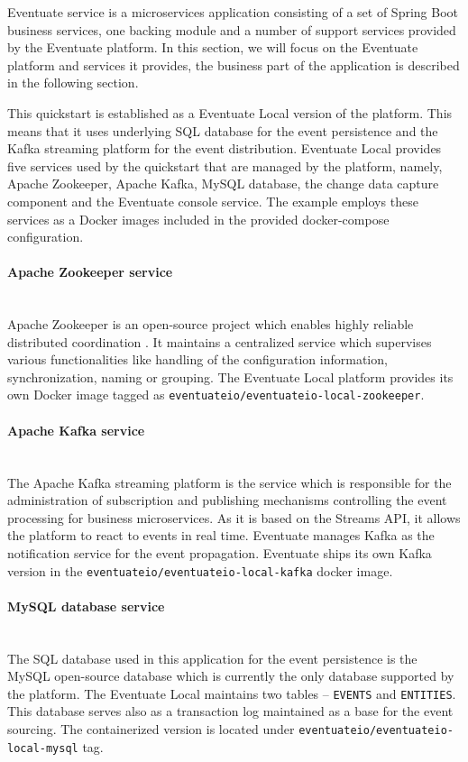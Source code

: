\documentclass[oneside,
  digital, %
  table,   %
  lof,     %
  lot,     %
]{fithesis3}
\newcommand{\newlinepar}[1]{\paragraph{#1}\needspace{4\baselineskip}\mbox{}\\}
\begin{document}
Eventuate service is a microservices application consisting of a set of Spring Boot \cite{spring_boot} business services, one backing module and a number of support services provided by the Eventuate platform. In this section, we will focus on the Eventuate platform and services it provides, the business part of the application is described in the following section.

This quickstart is established as a Eventuate Local version of the platform. This means that it uses underlying SQL database for the event persistence and the Kafka streaming platform for the event distribution. Eventuate Local provides five services used by the quickstart that are managed by the platform, namely, Apache Zookeeper, Apache Kafka, MySQL database, the change data capture component and the Eventuate console service. The example employs these services as a Docker images included in the provided docker-compose configuration.

\newlinepar{Apache Zookeeper service}

Apache Zookeeper is an open-source project which enables highly reliable distributed coordination \cite{apache_zookeeper}. It maintains a centralized service which supervises various functionalities like handling of the configuration information, synchronization, naming or grouping. The Eventuate Local platform provides its own Docker image tagged as \texttt{eventuateio/eventuateio-local-zookeeper}.

\newlinepar{Apache Kafka service}

The Apache Kafka streaming platform is the service which is responsible for the administration of subscription and publishing mechanisms controlling the event processing for business microservices. As it is based on the Streams API, it allows the platform to react to events in real time. Eventuate manages Kafka as the notification service for the event propagation. Eventuate ships its own Kafka version in the \texttt{eventuateio/eventuateio-local-kafka} docker image.

\newlinepar{MySQL database service}

The SQL database used in this application for the event persistence is the MySQL open-source database which is currently the only database supported by the platform. The Eventuate Local maintains two tables -- \texttt{EVENTS} and \texttt{ENTITIES}. This database serves also as a transaction log maintained as a base for the event sourcing. The containerized version is located under \texttt{eventuateio/eventuateio-local-mysql} tag.
\end{document}
